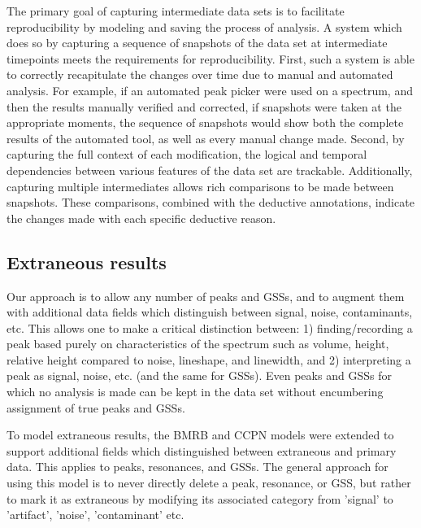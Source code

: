 The primary goal of capturing intermediate data sets is to 
facilitate reproducibility by modeling and saving the process of analysis.  
A system which does so by capturing a sequence of snapshots of the data set 
at intermediate timepoints meets the requirements for reproducibility.
First, such a system is able to correctly recapitulate the changes over time
due to manual and automated analysis.  For example,
if an automated peak picker were used on a spectrum, and then the results
manually verified and corrected, if snapshots were taken at the appropriate
moments, the sequence of snapshots would show both the complete results of
the automated tool, as well as every manual change made.
Second, by capturing the full context of each modification, the logical and 
temporal dependencies between various features of the data set are trackable.
Additionally, capturing multiple intermediates allows rich comparisons to be made 
between snapshots.  These comparisons, combined with the deductive annotations,
indicate the changes made with each specific deductive reason. 


\subsection{Extraneous results}
Our approach is to allow any number of peaks and GSSs, and to 
augment them with additional data fields which distinguish between signal, 
noise, contaminants, etc.  This allows one to make a critical distinction 
between: 1) finding/recording a peak based purely on characteristics of 
the spectrum such as volume, height, relative height compared to noise, 
lineshape, and linewidth, and 2) interpreting a peak as signal, noise, 
etc. (and the same for GSSs).  Even peaks and GSSs for 
which no analysis is made can be kept in the data set without encumbering 
assignment of true peaks and GSSs.

To model extraneous results, the BMRB and CCPN models \cite{bmrb, ccpn}
were extended to support additional fields which distinguished between 
extraneous and primary data.
This applies to peaks, resonances, and GSSs.
The general approach for using this model is to never directly delete
a peak, resonance, or GSS, but rather to mark it as extraneous by modifying
its associated category from 'signal' to 'artifact', 'noise', 'contaminant'
etc.

